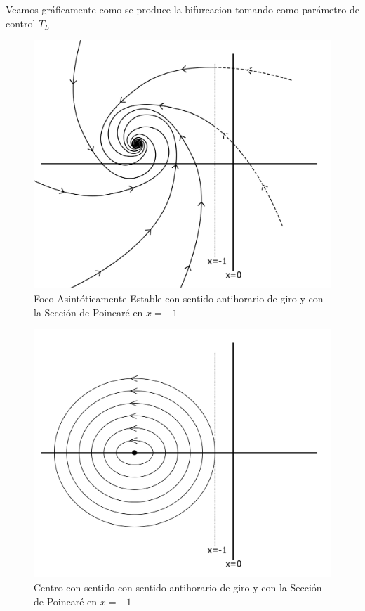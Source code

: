 \documentclass[12pt,a4paper]{report} %
\begin{document}
	
	\newpage
	
	Veamos gráficamente como se produce la bifurcacion tomando como parámetro de control $T_L$
	
	\begin{figure}[h]
		\centering
		\includegraphics[width=1\textwidth]{foco3.jpg}
		\caption{Foco Asintóticamente Estable con sentido antihorario de giro y con la Sección de Poincaré en $x=-1$}
		\label{fig:foco3}
	\end{figure}\smallskip
	
	\newpage
	
		\begin{figure}[h]
		\centering
		\includegraphics[width=1\textwidth]{centro2.jpg}
		\caption{Centro con sentido con sentido antihorario de giro y con la Sección de Poincaré en $x=-1$}
		\label{fig:centro2}
	\end{figure}\smallskip
	
\end{document}
